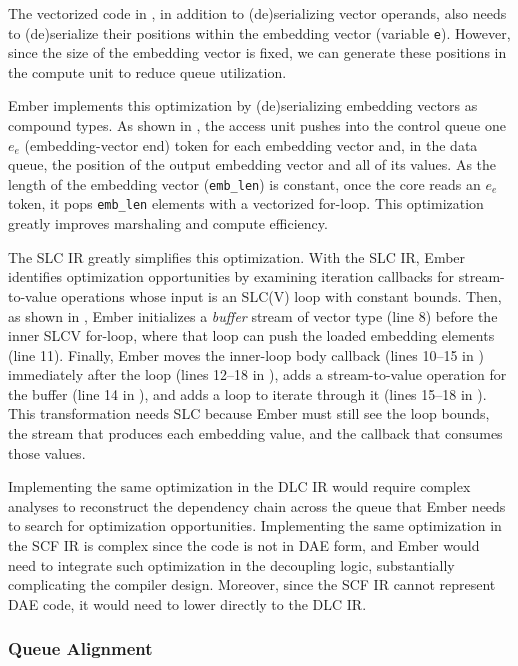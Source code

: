 The vectorized code in , in addition to (de)serializing vector operands, also needs to (de)serialize their positions within the embedding vector (variable \texttt{e}). However, since the size of the embedding vector is fixed, we can generate these positions in the compute unit to reduce queue utilization.

Ember implements this optimization by (de)serializing embedding vectors as compound types. As shown in , the access unit pushes into the control queue one $e_e$ (embedding-vector end) token for each embedding vector and, in the data queue, the position of the output embedding vector and all of its values. As the length of the embedding vector (\texttt{emb\_len}) is constant, once the core reads an $e_e$ token, it pops \texttt{emb\_len} elements with a vectorized for-loop. This optimization greatly improves marshaling and compute efficiency.

The SLC IR greatly simplifies this optimization. With the SLC IR, Ember identifies optimization opportunities by examining iteration callbacks for stream-to-value operations whose input is an SLC(V) loop with constant bounds. Then, as shown in , Ember initializes a \emph{buffer} stream of vector type (line 8) before the inner SLCV for-loop, where that loop can push the loaded embedding elements (line 11). Finally, Ember moves the inner-loop body callback (lines 10--15 in ) immediately after the loop (lines 12--18 in ), adds a stream-to-value operation for the buffer (line 14 in ), and adds a loop to iterate through it (lines 15--18 in ). This transformation needs SLC because Ember must still see the loop bounds, the stream that produces each embedding value, and the callback that consumes those values.

Implementing the same optimization in the DLC IR would require complex analyses to reconstruct the dependency chain across the queue that Ember needs to search for optimization opportunities. Implementing the same optimization in the SCF IR is complex since the code is not in DAE form, and Ember would need to integrate such optimization in the decoupling logic, substantially complicating the compiler design. Moreover, since the SCF IR cannot represent DAE code, it would need to lower directly to the DLC IR.

\subsubsection{Queue Alignment} \label{sec:queue-alignment} %

